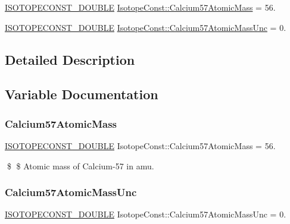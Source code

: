 \begin{DoxyCompactItemize}
\item 
\mbox{\hyperlink{group___isotope_const-_macros_ga8f45a7272ce02c0b4c65c44636ed719a}{I\+S\+O\+T\+O\+P\+E\+C\+O\+N\+S\+T\+\_\+\+D\+O\+U\+B\+LE}} \mbox{\hyperlink{group___isotope_const-_calcium-_ca57_gade2c054c542a96cbad568ab11d44125f}{Isotope\+Const\+::\+Calcium57\+Atomic\+Mass}} = 56.
\item 
\mbox{\hyperlink{group___isotope_const-_macros_ga8f45a7272ce02c0b4c65c44636ed719a}{I\+S\+O\+T\+O\+P\+E\+C\+O\+N\+S\+T\+\_\+\+D\+O\+U\+B\+LE}} \mbox{\hyperlink{group___isotope_const-_calcium-_ca57_gad68359d670f1b0b6bdb1fa12c86b6052}{Isotope\+Const\+::\+Calcium57\+Atomic\+Mass\+Unc}} = 0.
\end{DoxyCompactItemize}


\subsection{Detailed Description}


\subsection{Variable Documentation}
\mbox{\label{group___isotope_const-_calcium-_ca57_gade2c054c542a96cbad568ab11d44125f}} 
\subsubsection{\texorpdfstring{Calcium57\+Atomic\+Mass}{Calcium57AtomicMass}}
{\footnotesize\ttfamily \mbox{\hyperlink{group___isotope_const-_macros_ga8f45a7272ce02c0b4c65c44636ed719a}{I\+S\+O\+T\+O\+P\+E\+C\+O\+N\+S\+T\+\_\+\+D\+O\+U\+B\+LE}} Isotope\+Const\+::\+Calcium57\+Atomic\+Mass = 56.}

\$ \$ Atomic mass of Calcium-\/57 in amu. \mbox{\label{group___isotope_const-_calcium-_ca57_gad68359d670f1b0b6bdb1fa12c86b6052}} 
\subsubsection{\texorpdfstring{Calcium57\+Atomic\+Mass\+Unc}{Calcium57AtomicMassUnc}}
{\footnotesize\ttfamily \mbox{\hyperlink{group___isotope_const-_macros_ga8f45a7272ce02c0b4c65c44636ed719a}{I\+S\+O\+T\+O\+P\+E\+C\+O\+N\+S\+T\+\_\+\+D\+O\+U\+B\+LE}} Isotope\+Const\+::\+Calcium57\+Atomic\+Mass\+Unc = 0.}


